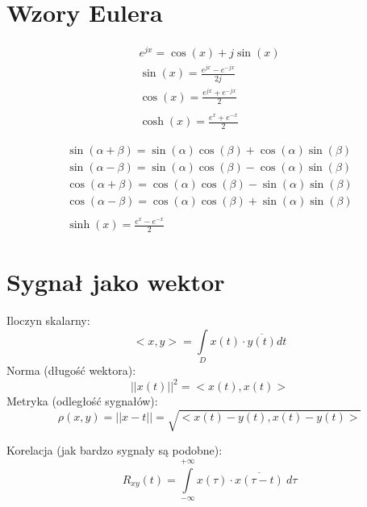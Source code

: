 \section{Wzory Eulera}
% 
\begin{multicols}{2}
    \begin{gather*}
        e^{jx} = \cos{(x)} + j\sin{(x)}\\
        \sin{(x)} = \frac{e^{jx}-e^{-jx}}{2j}\\
        \cos{(x)} = \frac{e^{jx}+e^{-jx}}{2}\\\\
        \cosh{(x)} = \frac{e^x+e^{-x}}{2}
    \end{gather*}

    \begin{gather*}
        \sin{(\alpha+\beta)} = \sin{(\alpha)}\cos{(\beta)} + \cos{(\alpha)}\sin{(\beta)}\\
        \sin{(\alpha-\beta)} = \sin{(\alpha)}\cos{(\beta)} - \cos{(\alpha)}\sin{(\beta)}\\
        \cos{(\alpha+\beta)} = \cos{(\alpha)}\cos{(\beta)} - \sin{(\alpha)}\sin{(\beta)}\\
        \cos{(\alpha-\beta)} = \cos{(\alpha)}\cos{(\beta)} + \sin{(\alpha)}\sin{(\beta)}
        \\\\
        \sinh{(x)}=\frac{e^x-e^{-x}}{2}
    \end{gather*}
\end{multicols}


\section{Sygnał jako wektor}
    Iloczyn skalarny:
    \begin{equation*}
        <x, y> = \int\limits_{D} x(t) \cdot \overline{y(t)} dt
    \end{equation*}
    Norma (długość wektora):
    \begin{equation*}
        ||x(t)||^2 = <x(t), x(t)>
    \end{equation*}
    Metryka (odległość sygnałów):
    \begin{equation*}
        \rho(x,y) = ||x-t|| = \sqrt{<x(t)-y(t), x(t)-y(t)>}
    \end{equation*}

    \noindent
    Korelacja (jak bardzo sygnały są podobne):
    \begin{equation*}
        R_{xy}(t) = \int\limits_{-\infty}^{+\infty}x(\tau)\cdot \overline{x(\tau-t)}\ d\tau
    \end{equation*}


